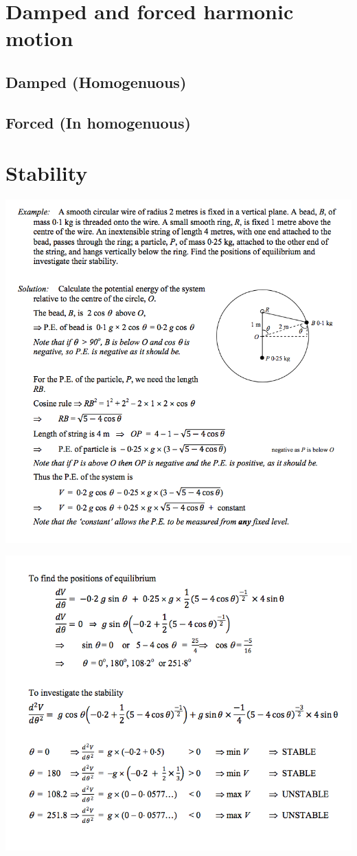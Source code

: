 \documentclass[a4paper]{article}
\begin{document}
\section{Damped and forced harmonic motion}
\subsection{Damped (Homogenuous)}
\subsection{Forced (In homogenuous)}

\section{Stability}
\begin{center}
    \includegraphics[scale=0.5]{img_M/20_eg1}
\end{center}
\begin{center}
    \includegraphics[scale=0.5]{img_M/20_eg2}
\end{center}
\end{document}
